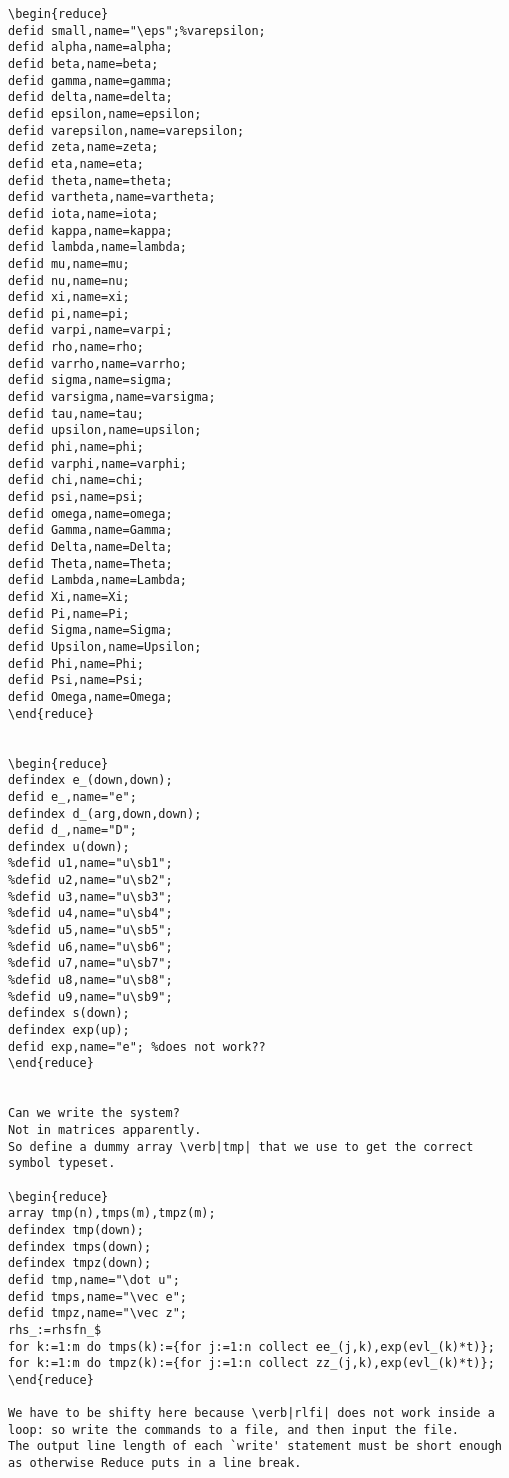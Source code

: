 \begin{reduce}
\begin{verbatim}
\begin{reduce}
defid small,name="\eps";%varepsilon;
defid alpha,name=alpha;
defid beta,name=beta;
defid gamma,name=gamma;
defid delta,name=delta;
defid epsilon,name=epsilon;
defid varepsilon,name=varepsilon;
defid zeta,name=zeta;
defid eta,name=eta;
defid theta,name=theta;
defid vartheta,name=vartheta;
defid iota,name=iota;
defid kappa,name=kappa;
defid lambda,name=lambda;
defid mu,name=mu;
defid nu,name=nu;
defid xi,name=xi;
defid pi,name=pi;
defid varpi,name=varpi;
defid rho,name=rho;
defid varrho,name=varrho;
defid sigma,name=sigma;
defid varsigma,name=varsigma;
defid tau,name=tau;
defid upsilon,name=upsilon;
defid phi,name=phi;
defid varphi,name=varphi;
defid chi,name=chi;
defid psi,name=psi;
defid omega,name=omega;
defid Gamma,name=Gamma;
defid Delta,name=Delta;
defid Theta,name=Theta;
defid Lambda,name=Lambda;
defid Xi,name=Xi;
defid Pi,name=Pi;
defid Sigma,name=Sigma;
defid Upsilon,name=Upsilon;
defid Phi,name=Phi;
defid Psi,name=Psi;
defid Omega,name=Omega;
\end{reduce}


\begin{reduce}
defindex e_(down,down);
defid e_,name="e";
defindex d_(arg,down,down);
defid d_,name="D";
defindex u(down);
%defid u1,name="u\sb1"; 
%defid u2,name="u\sb2"; 
%defid u3,name="u\sb3"; 
%defid u4,name="u\sb4"; 
%defid u5,name="u\sb5"; 
%defid u6,name="u\sb6"; 
%defid u7,name="u\sb7"; 
%defid u8,name="u\sb8"; 
%defid u9,name="u\sb9"; 
defindex s(down);
defindex exp(up);
defid exp,name="e"; %does not work??
\end{reduce}


Can we write the system?  
Not in matrices apparently.
So define a dummy array \verb|tmp| that we use to get the correct symbol typeset.

\begin{reduce}
array tmp(n),tmps(m),tmpz(m);
defindex tmp(down);
defindex tmps(down);
defindex tmpz(down);
defid tmp,name="\dot u";
defid tmps,name="\vec e";
defid tmpz,name="\vec z";
rhs_:=rhsfn_$
for k:=1:m do tmps(k):={for j:=1:n collect ee_(j,k),exp(evl_(k)*t)};
for k:=1:m do tmpz(k):={for j:=1:n collect zz_(j,k),exp(evl_(k)*t)};
\end{reduce}

We have to be shifty here because \verb|rlfi| does not work inside a loop: so write the commands to a file, and then input the file.
The output line length of each `write' statement must be short enough as otherwise Reduce puts in a line break.


\end{verbatim}
\end{reduce}
